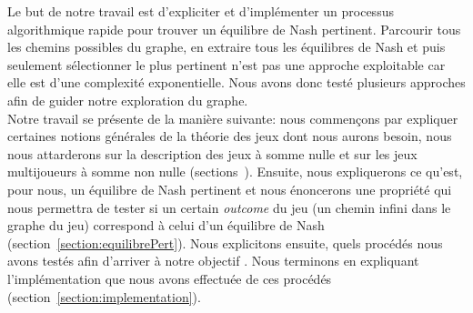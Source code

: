 Le but de notre travail est d'expliciter et d'implémenter un processus algorithmique rapide pour trouver un équilibre de Nash pertinent. Parcourir tous les chemins possibles du graphe, en extraire tous les équilibres de Nash et puis seulement sélectionner le plus pertinent n'est pas une approche exploitable car elle est d'une complexité exponentielle. Nous avons donc testé plusieurs approches afin de guider notre exploration du graphe.\\


Notre travail se présente de la manière suivante: nous commençons par expliquer certaines notions générales de la théorie des jeux dont nous aurons besoin, nous nous attarderons sur la description des jeux à somme nulle et sur les jeux multijoueurs à somme non nulle (sections~). Ensuite, nous expliquerons ce qu'est, pour nous, un équilibre de Nash pertinent et nous énoncerons une propriété qui nous permettra de tester si un certain \emph{outcome} du jeu (un chemin infini dans le graphe du jeu) correspond à celui d'un équilibre de Nash (section~\ref{section:equilibrePert}). Nous explicitons ensuite, quels procédés nous avons testés afin d'arriver à notre objectif . Nous terminons en expliquant l'implémentation que nous avons effectuée de ces procédés  (section~\ref{section:implementation}).
